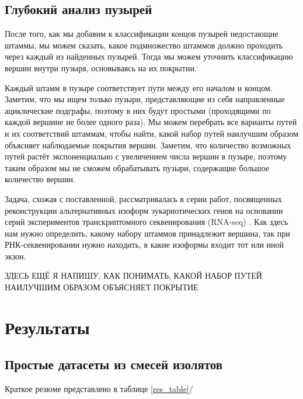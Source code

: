 \documentclass{spbau-diploma}
\begin{document}
\subsection{Глубокий анализ пузырей}

После того, как мы добавим к классификации концов пузырей недостающие штаммы, мы можем сказать, какое подмножество штаммов должно проходить через каждый из найденных пузырей. Тогда мы можем уточнить классификацию вершин внутри пузыря, основываясь на их покрытии.

Каждый штамм в пузыре соответствует пути между его началом и концом. Заметим, что мы ищем только пузыри, представляющие из себя направленные ациклические подграфы, поэтому в них будут простыми (проходящими по каждой вершине не более одного раза). Мы можем перебрать все варианты путей и их соответствий штаммам, чтобы найти, какой набор путей наилучшим образом объясняет наблюдаемые покрытия вершин. Заметим, что количество возможных путей растёт экспоненциально с увеличением числа вершин в пузыре, поэтому таким образом мы не сможем обрабатывать пузыри, содержащие большое количество вершин.

Задача, схожая с поставленной, рассматривалась в серии работ, посвященных реконструкции альтернативных изоформ эукариотических генов на основании серий экспериментов транскриптомного секвенирования (RNA-seq) \cite{flipflop2, other_flows, flipflop1}. Как здесь нам нужно определить, какому набору штаммов принадлежит вершина, так при РНК-секвенировании нужно находить, в какие изоформы входит тот или иной экзон.


ЗДЕСЬ ЕЩЁ Я НАПИШУ, КАК ПОНИМАТЬ, КАКОЙ НАБОР ПУТЕЙ НАИЛУЧШИМ ОБРАЗОМ ОБЪЯСНЯЕТ ПОКРЫТИЕ






\section{Результаты}
\subsection{Простые датасеты из смесей изолятов}
Краткое резюме представлено в таблице \ref{res_table}/
\end{document}
